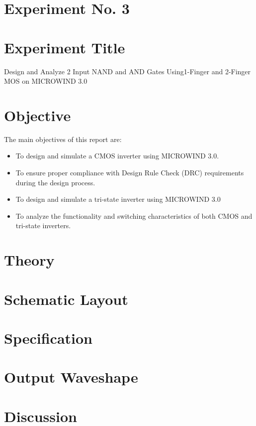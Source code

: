 \documentclass[a4paper,12pt]{article}
\begin{document}
	\section{Experiment No. 3}
	
	
	\section{Experiment Title }
 Design and Analyze 2 Input NAND and AND Gates Using1-Finger and 2-Finger MOS on
	MICROWIND 3.0
	\section{Objective}
	The main objectives of this report are:
	\begin{itemize}
		\item To design and simulate a CMOS inverter using MICROWIND 3.0.
		\item To ensure proper compliance with Design Rule Check (DRC) requirements during the design process.
		\item To design and simulate a tri-state inverter using MICROWIND 3.0
		\item To analyze the functionality and switching characteristics of both CMOS and tri-state inverters.
	\end{itemize}
	\section{Theory}
	\section{Schematic Layout }
	\section{Specification}
	\section{Output Waveshape }
	\section{Discussion }
	
	
\end{document}

